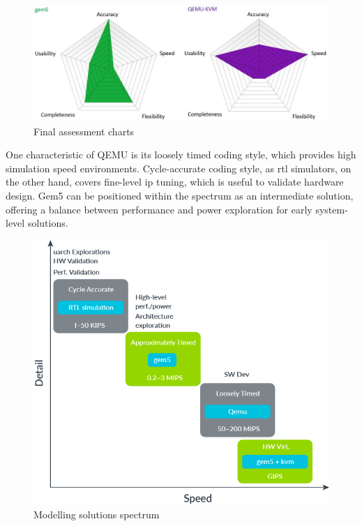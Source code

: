 \begin{figure}[H]
	\centering
 	\includegraphics[width=0.8\linewidth]{Images/gem5VSQEMU.png}
 	\caption{Final assessment charts \cite{morales2016evaluating}}
\end{figure}

One characteristic of QEMU is its loosely timed coding style, which provides high simulation speed environments. Cycle-accurate coding style, 
as \gls{rtl} simulators, on the other hand, covers fine-level \gls{ip} tuning, which is useful to validate hardware design. Gem5 can be positioned 
within the spectrum as an intermediate solution, offering a balance between performance and power exploration for early system-level solutions.

\begin{figure}[H]
	\centering
 	\includegraphics[width=0.6\linewidth]{Images/SimulationComparation.png}
 	\caption{ Modelling solutions spectrum \cite{herrera2020running}}
\end{figure}

